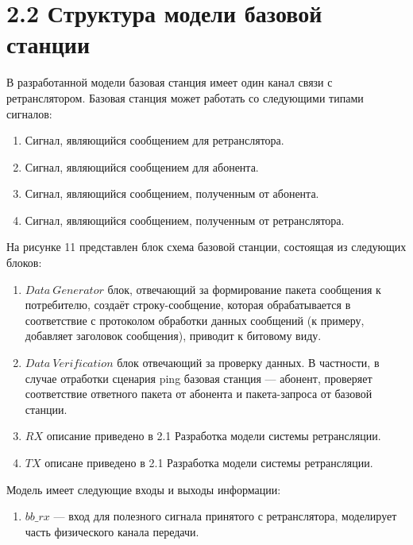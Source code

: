 	\newpage
	\pagebreak
	\clearpage
	
	\section*{\large{2.2 Структура модели базовой станции}}
\begin{onehalfspace}

В разработанной модели базовая станция имеет один канал связи с ретранслятором. Базовая станция может работать со следующими типами сигналов: 
		\begin{enumerate} 	
		\item Сигнал, являющийся сообщением для ретранслятора. 
	
		\item Сигнал, являющийся сообщением для абонента.

            \item Сигнал, являющийся сообщением, полученным от абонента. 
	
		\item Сигнал, являющийся сообщением, полученным от ретранслятора.
	\end{enumerate}

	На рисунке 11 представлен блок схема базовой станции, состоящая из следующих блоков: 
	
	\begin{enumerate} 	
		\item $Data \ Generator$ блок, отвечающий за формирование пакета сообщения к потребителю, создаёт строку-сообщение, которая обрабатывается в соответствие с протоколом обработки данных сообщений (к примеру, добавляет заголовок сообщения), приводит к битовому виду. 
		
		\item  $Data \ Verification$ блок отвечающий за проверку данных. В частности, в случае отработки сценария ping базовая станция — абонент, проверяет соответствие ответного пакета от абонента и пакета-запроса от базовой станции.
		
		\item  $RX$ описание приведено в 2.1 Разработка модели системы ретрансляции.
		
		\item  $TX$ описане приведено в 2.1 Разработка модели системы ретрансляции.
	\end{enumerate}
	
    Модель имеет следующие входы и выходы информации: 
    \begin{enumerate} 	
		\item $bb\_rx$ — вход для полезного сигнала принятого с ретранслятора, моделирует часть физического канала передачи.
  

\end{enumerate}
\end{onehalfspace}
